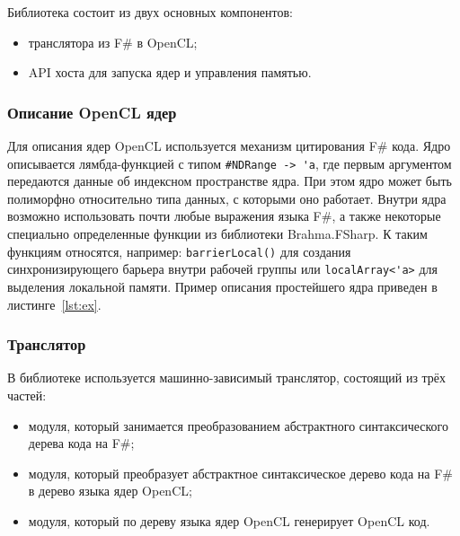 \noindent Библиотека состоит из двух основных компонентов:
\begin{itemize}
    \item транслятора из F\# в OpenCL;
    \item API хоста для запуска ядер и управления памятью.
\end{itemize}

\subsubsection{Описание OpenCL ядер}
Для описания ядер OpenCL используется механизм цитирования F\# кода. Ядро описывается лямбда-функцией с типом \verb|#NDRange -> 'a|, где первым аргументом передаются данные об индексном пространстве ядра. При этом ядро может быть полиморфно относительно типа данных, с которыми оно работает. Внутри ядра возможно использовать почти любые выражения языка F\#, а также некоторые специально определенные функции из библиотеки Brahma.FSharp. К таким функциям относятся, например: \verb|barrierLocal()| для создания синхронизирующего барьера внутри рабочей группы или \verb|localArray<'a>| для выделения локальной памяти. Пример описания простейшего ядра приведен в листинге~\ref{lst:ex}.

\newpage


\subsubsection{Транслятор}
В библиотеке используется машинно-зависимый транслятор, состоящий из трёх частей:
\begin{itemize}
    \item модуля, который занимается преобразованием абстрактного синтаксического дерева кода на F\#;
    \item модуля, который преобразует абстрактное синтаксическое дерево кода на F\# в дерево языка ядер OpenCL;
    \item модуля, который по дереву языка ядер OpenCL генерирует OpenCL код. 
\end{itemize}

